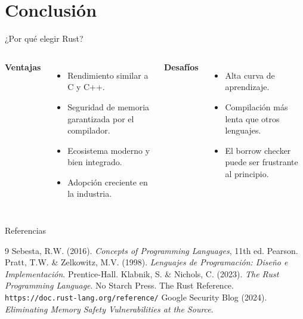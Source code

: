 \documentclass[11pt, aspectratio=169]{beamer}
\begin{document}
	\section{Conclusión}

	\begin{frame}{¿Por qué elegir Rust?}
		\begin{columns}
			\textbf{Ventajas}
			\begin{itemize}
				\item Rendimiento similar a C y C++.
				\item Seguridad de memoria garantizada por el compilador.
				\item Ecosistema moderno y bien integrado.
				\item Adopción creciente en la industria.
			\end{itemize}
			
			\textbf{Desafíos}
			\begin{itemize}
				\item Alta curva de aprendizaje.
				\item Compilación más lenta que otros lenguajes.
				\item El borrow checker puede ser frustrante al principio.
			\end{itemize}
		\end{columns}

	\end{frame}

	\begin{frame}{Referencias}
		\begin{thebibliography}{9}
			 Sebesta, R.W. (2016). \textit{Concepts of Programming Languages}, 11th ed. Pearson.
			 Pratt, T.W. \& Zelkowitz, M.V. (1998). \textit{Lenguajes de Programación: Diseño e Implementación}. Prentice-Hall.
			 Klabnik, S. \& Nichols, C. (2023). \textit{The Rust Programming Language}. No Starch Press.
			 The Rust Reference. \texttt{https://doc.rust-lang.org/reference/}
			 Google Security Blog (2024). \textit{Eliminating Memory Safety Vulnerabilities at the Source}.
		\end{thebibliography}
	\end{frame}
	
\end{document}
